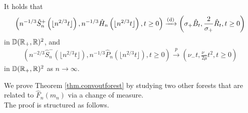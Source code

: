 \begin{theorem}\label{thm.convoutforest}
It holds that
\begin{align*}\left(n^{-1/3}\hat{S}^{+}_n\left(\lfloor n^{2/3}t\rfloor \right),n^{-1/3}\hat{H}_{n}\left(\lfloor n^{2/3}t\rfloor \right), t\geq 0\right)
\xrightarrow[]{\mathrm{(d)}}\left(\sigma_+ \hat{B}_t, \frac{2}{\sigma_+} \hat{R}_t, t\geq 0\right)\end{align*}
in ${\mathbb D}({\mathbb R}_+,{\mathbb R})^2$, and 
\begin{align*}\left( n^{-2/3}\hat{S}_n^-\left(\lfloor n^{2/3}t\rfloor \right), n^{-1/3}\hat{P}_n\left(\lfloor n^{2/3}t\rfloor \right), t\geq 0\right)\overset{p}{\to}\left(\nu_-t,  \frac{\nu_-}{2\mu} t^2, t\geq 0\right)\end{align*}
in ${\mathbb D}({\mathbb R}_+,{\mathbb R})^2$ as $n\to \infty$. 
\end{theorem}
We prove Theorem \ref{thm.convoutforest} by studying two other forests that are related to $\hat{F}_n(m_n)$ via a change of measure.  \\
The proof is structured as follows.
